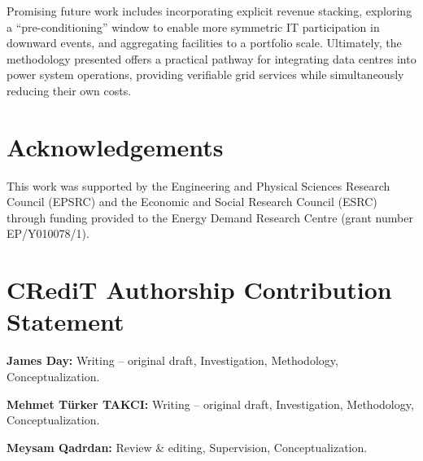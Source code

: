 \documentclass[lettersize,journal]{IEEEtran}
\begin{document}
Promising future work includes incorporating explicit revenue stacking, exploring a ``pre-conditioning'' window to enable more symmetric IT participation in downward events, and aggregating facilities to a portfolio scale. Ultimately, the methodology presented offers a practical pathway for integrating data centres into power system operations, providing verifiable grid services while simultaneously reducing their own costs.




\section*{Acknowledgements}

This work was supported by the Engineering and Physical Sciences Research Council (EPSRC) and the Economic and Social Research Council (ESRC) through funding provided to the Energy Demand Research Centre (grant number EP/Y010078/1).

\section*{CRediT Authorship Contribution Statement}

\noindent \textbf{James Day:} Writing – original draft, Investigation, Methodology, Conceptualization.

\medskip
\noindent \textbf{Mehmet Türker TAKCI:} Writing – original draft, Investigation, Methodology, Conceptualization.


\medskip
\noindent \textbf{Meysam Qadrdan:} Review \& editing, Supervision, Conceptualization.
\end{document}
